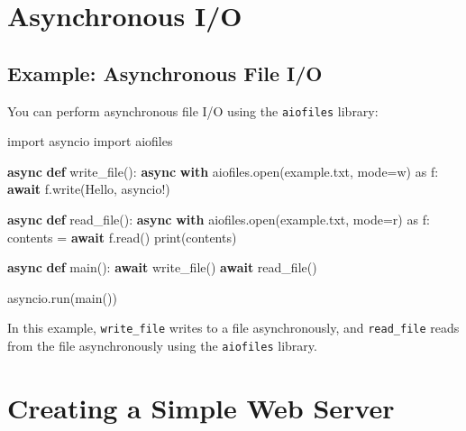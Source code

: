 \documentclass[
  letterpaper,
  DIV=11,
  numbers=noendperiod]{scrreprt}
\newenvironment{Shaded}{\begin{snugshade}}{\end{snugshade}}
\newcommand{\BuiltInTok}[1]{\textcolor[rgb]{0.00,0.23,0.31}{#1}}
\newcommand{\ControlFlowTok}[1]{\textcolor[rgb]{0.00,0.23,0.31}{\textbf{#1}}}
\newcommand{\ImportTok}[1]{\textcolor[rgb]{0.00,0.46,0.62}{#1}}
\newcommand{\KeywordTok}[1]{\textcolor[rgb]{0.00,0.23,0.31}{\textbf{#1}}}
\newcommand{\NormalTok}[1]{\textcolor[rgb]{0.00,0.23,0.31}{#1}}
\newcommand{\OperatorTok}[1]{\textcolor[rgb]{0.37,0.37,0.37}{#1}}
\newcommand{\StringTok}[1]{\textcolor[rgb]{0.13,0.47,0.30}{#1}}
\begin{document}
\section{Asynchronous I/O}\label{asynchronous-io}

\subsection{Example: Asynchronous File
I/O}\label{example-asynchronous-file-io}

You can perform asynchronous file I/O using the \texttt{aiofiles}
library:

\begin{Shaded}
\begin{Highlighting}[]
\ImportTok{import}\NormalTok{ asyncio}
\ImportTok{import}\NormalTok{ aiofiles}

\ControlFlowTok{async} \KeywordTok{def}\NormalTok{ write\_file():}
    \ControlFlowTok{async} \ControlFlowTok{with}\NormalTok{ aiofiles.}\BuiltInTok{open}\NormalTok{(}\StringTok{\textquotesingle{}example.txt\textquotesingle{}}\NormalTok{, mode}\OperatorTok{=}\StringTok{\textquotesingle{}w\textquotesingle{}}\NormalTok{) }\ImportTok{as}\NormalTok{ f:}
        \ControlFlowTok{await}\NormalTok{ f.write(}\StringTok{\textquotesingle{}Hello, asyncio!\textquotesingle{}}\NormalTok{)}

\ControlFlowTok{async} \KeywordTok{def}\NormalTok{ read\_file():}
    \ControlFlowTok{async} \ControlFlowTok{with}\NormalTok{ aiofiles.}\BuiltInTok{open}\NormalTok{(}\StringTok{\textquotesingle{}example.txt\textquotesingle{}}\NormalTok{, mode}\OperatorTok{=}\StringTok{\textquotesingle{}r\textquotesingle{}}\NormalTok{) }\ImportTok{as}\NormalTok{ f:}
\NormalTok{        contents }\OperatorTok{=} \ControlFlowTok{await}\NormalTok{ f.read()}
        \BuiltInTok{print}\NormalTok{(contents)}

\ControlFlowTok{async} \KeywordTok{def}\NormalTok{ main():}
    \ControlFlowTok{await}\NormalTok{ write\_file()}
    \ControlFlowTok{await}\NormalTok{ read\_file()}

\NormalTok{asyncio.run(main())}
\end{Highlighting}
\end{Shaded}

In this example, \texttt{write\_file} writes to a file asynchronously,
and \texttt{read\_file} reads from the file asynchronously using the
\texttt{aiofiles} library.

\section{Creating a Simple Web
Server}\label{creating-a-simple-web-server}
\end{document}
